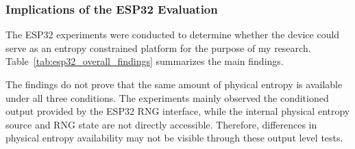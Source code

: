 \documentclass[a4paper, 12pt]{article}
\begin{document}
\subsubsection{Implications of the ESP32 Evaluation}

The ESP32 experiments were conducted to determine whether the device could
serve as an entropy constrained platform for the purpose of my research. Table~\ref{tab:esp32_overall_findings} summarizes
the main findings.

\begin{table}[htbp]
    \centering
    \caption{Summary of ESP32 experimental findings}
    \label{tab:esp32_overall_findings}
\end{table}

The findings do not prove that the same amount of physical entropy is
available under all three conditions. The experiments mainly observed the
conditioned output provided by the ESP32 RNG interface, while the internal
physical entropy source and RNG state are not directly accessible. Therefore,
differences in physical entropy availability may not be visible through these
output level tests.
\end{document}
